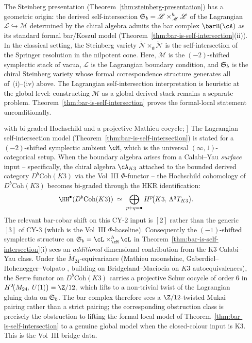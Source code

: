\begin{remark}
\label{rem:steinberg-lagrangian-origin}
The Steinberg presentation
(Theorem~\ref{thm:steinberg-presentation}) has a geometric origin:
the derived self-intersection
$\mathfrak{S}_b = \mathscr{L} \times_{\mathscr{M}}^h \mathscr{L}$
of the Lagrangian $\mathscr{L} \hookrightarrow \mathscr{M}$
determined by the chiral algebra admits the bar complex
$\barB(\cA)$ as its standard formal bar/Koszul model
(Theorem~\ref{thm:bar-is-self-intersection}(ii)).
In the classical setting, the Steinberg variety
$\widetilde{\mathcal{N}} \times_{\mathfrak{g}}
\widetilde{\mathcal{N}}$ is the self-intersection of the Springer
resolution in the nilpotent cone. Here, $\mathscr{M}$ is the
$(-2)$-shifted symplectic stack of vacua, $\mathscr{L}$ is the
Lagrangian boundary condition, and $\mathfrak{S}_b$ is the chiral
Steinberg variety whose formal correspondence structure generates
all of~(i)--(iv) above.
The Lagrangian self-intersection interpretation is heuristic at the
global level: constructing $\mathscr{M}$ as a global derived stack
remains a separate problem. Theorem~\ref{thm:bar-is-self-intersection}
proves the formal-local statement unconditionally.
\end{remark}

\begin{remark}[K3 input gives bar-cobar shift [2]
with bi-graded Hochschild and a projective Mathieu cocycle;
\ClaimStatusProvedElsewhere]
\label{rem:bar-cobar-3-K3-shift2}
The Lagrangian self-intersection model
(Theorem~\ref{thm:bar-is-self-intersection}) is stated for a
$(-2)$-shifted symplectic ambient $\cM$, which is the universal
$(\infty,1)$-categorical setup. When the boundary algebra arises
from a Calabi--Yau \emph{surface} input -- specifically, the
chiral algebra $\cA_{K3}$ attached to the bounded derived category
$D^b\mathrm{Coh}(K3)$ via the Vol~III $\Phi$-functor -- the
Hochschild cohomology of $D^b\mathrm{Coh}(K3)$ becomes bi-graded
through the HKR identification:
\[
\HH^\bullet(D^b\mathrm{Coh}(K3))
\;\simeq\;
\bigoplus_{p+q=\bullet}
H^p\!\bigl(K3,\, \Lambda^q T_{K3}\bigr).
\]
The relevant bar-cobar shift on this CY-$2$ input is $[2]$ rather
than the generic $[3]$ of CY-$3$ (which is the Vol~III
$\Phi$-baseline). Consequently the
$(-1)$-shifted symplectic structure on
$\Steinb_b = \cL\times^h_\cM\cL$ in
Theorem~\ref{thm:bar-is-self-intersection}(i) sees an
\emph{additional} dimensional contribution from the K3 Calabi--Yau
class. Under
the $\widetilde{M}_{24}$-equivariance (Mathieu moonshine, Gaberdiel--Hohenegger--Volpato
\cite{GHV12}, building on Bridgeland--Maciocia
\cite{BM01} on $K3$ autoequivalences), the Serre functor on
$D^b\mathrm{Coh}(K3)$ carries a projective Schur cocycle of order
$6$ in
$H^2\!\bigl(M_{24},\, U(1)\bigr) = \Z/12$,
which lifts to a non-trivial twist of the Lagrangian gluing data
on $\mathfrak{S}_b$. The bar complex therefore sees a $\Z/12$-twisted
Mukai pairing rather than a strict pairing; the corresponding
obstruction class is precisely the obstruction to lifting the
formal-local model of Theorem~\ref{thm:bar-is-self-intersection}
to a genuine global model when the closed-colour input is K3.
This is the Vol~III bridge data.
\end{remark}

